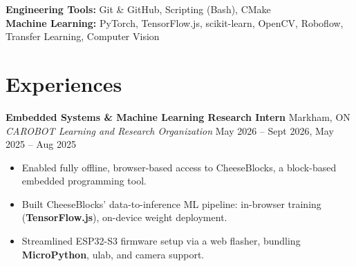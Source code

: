 \documentclass[10pt,letterpaper]{article}
\begin{document}
\hspace{0.75em}\textbf{Engineering Tools:} 
Git \& GitHub, Scripting (Bash), CMake \\

\hspace{0.75em}\textbf{Machine Learning:} 
PyTorch, TensorFlow.js, scikit-learn, OpenCV, Roboflow, 
Transfer Learning, Computer Vision \\







\section{Experiences}

\textbf{Embedded Systems \& Machine Learning Research Intern} \hfill
Markham, ON \\
\textit{CAROBOT Learning and Research Organization} \hfill 
May 2026 -- Sept 2026, May 2025 -- Aug 2025 \\
\begin{itemize}
    \item Enabled fully offline, browser-based access to CheeseBlocks, a block-based embedded programming tool.
    \item Built CheeseBlocks' data-to-inference ML pipeline: in-browser training (\textbf{TensorFlow.js}), on-device weight deployment.
    \item Streamlined ESP32-S3 firmware setup via a web flasher, bundling \textbf{MicroPython}, ulab, and camera support.
\end{itemize}
\end{document}
